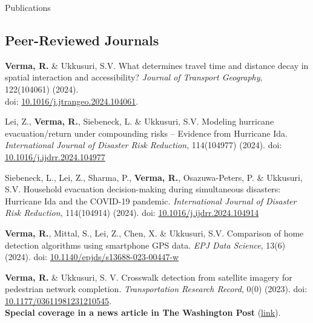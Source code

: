\documentclass{CV} %
\begin{document}
\begin{rSection}{Publications}
    \subsection*{Peer-Reviewed Journals}
    \begin{etaremune}
        \item \textbf{Verma, R.} \& Ukkusuri, S.V. What determines travel time and distance decay in spatial interaction and accessibility? \textit{Journal of Transport Geography}, 122(104061) (2024).\\doi: \href{https://doi.org/10.1016/j.jtrangeo.2024.104061}{10.1016/j.jtrangeo.2024.104061}.

        \item Lei, Z., \textbf{Verma, R.}, Siebeneck, L. \& Ukkusuri, S.V. Modeling hurricane evacuation/return under compounding risks – Evidence from Hurricane Ida.  \textit{International Journal of Disaster Risk Reduction}, 114(104977) (2024). doi: \href{https://doi.org/10.1016/j.ijdrr.2024.104977}{10.1016/j.ijdrr.2024.104977}

        \item Siebeneck, L., Lei, Z., Sharma, P., \textbf{Verma, R.}, Osazuwa-Peters, P. \& Ukkusuri, S.V. Household evacuation decision-making during simultaneous disasters: Hurricane Ida and the COVID-19 pandemic.
        \textit{International Journal of Disaster Risk Reduction}, 114(104914) (2024). doi: \href{https://doi.org/10.1016/j.ijdrr.2024.104914}{10.1016/j.ijdrr.2024.104914}

        \item \textbf{Verma, R.}, Mittal, S., Lei, Z., Chen, X. \& Ukkusuri, S.V. Comparison of home detection algorithms using smartphone GPS data.
        \textit{EPJ Data Science}, 13(6) (2024). doi: \href{https://doi.org/10.1140/epjds/s13688-023-00447-w}{10.1140/epjds/s13688-023-00447-w}
        
        \item \textbf{Verma, R.} \& Ukkusuri, S. V. Crosswalk detection from satellite imagery for pedestrian network completion. \textit{Transportation Research Record}, 0(0) (2023). doi: \href{https://doi.org/10.1177/03611981231210545}{10.1177/03611981231210545}.
        \\ \textbf{Special coverage in a news article in The Washington Post} (\href{https://www.washingtonpost.com/transportation/2023/02/25/sidewalks-crosswalks-study/}{link}).
        

\end{etaremune}
\end{rSection}
\end{document}
